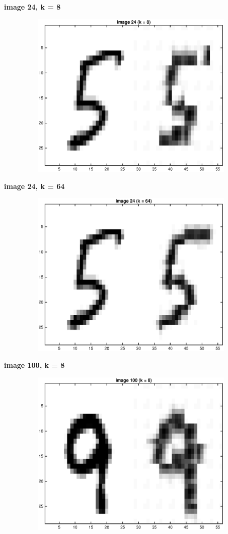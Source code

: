 \documentclass[twoside,11pt]{homework}
\begin{document}
\begin{center}
\textbf{image 24, k = 8}\par\medskip
\includegraphics[width=150mm, height = 80mm]{image-24,k-8.eps}
\end{center}

\begin{center}
\textbf{image 24, k = 64}\par\medskip
\includegraphics[width=150mm, height = 80mm]{image-24,k-64.eps}
\end{center}

\newpage


\begin{center}
\textbf{image 100, k = 8}\par\medskip
\includegraphics[width=150mm, height = 80mm]{image-100,k-8.eps}
\end{center}
\end{document}
